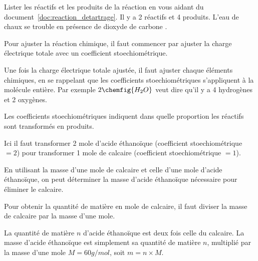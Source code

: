 \newpage
\pasDePagination
\setcounter{countCoupDePouce}{0}
\vspace*{-52pt}

%
\begin{coupDePouce}
  Lister les réactifs et les produits de la réaction en vous aidant du document~\ref{doc:reaction_detartrage}.
  Il y a 2 réactifs et 4 produits.
  L'eau de chaux se trouble en présence de dioxyde de carbone .
\end{coupDePouce}

%
\begin{coupDePouce}
  Pour ajuster la réaction chimique, il faut commencer par ajuster la charge électrique totale avec un coefficient stoechiométrique.
  
  Une fois la charge électrique totale ajustée, il faut ajuster chaque éléments chimiques, en se rappelant que les coefficients stoechiométriques s'appliquent à la molécule entière. 
  Par exemple $2\chemfig{H_2O}$ veut dire qu'il y a 4 hydrogènes et 2 oxygènes.
\end{coupDePouce}

%
\begin{coupDePouce}
  Les coefficients stoechiométriques indiquent dans quelle proportion les réactifs sont transformés en produits.
  
  Ici il faut transformer 2 mole d'acide éthanoïque (coefficient stoechiométrique $ = 2$) pour transformer 1 mole de calcaire (coefficient stoechiométrique $ = 1$).
  
  En utilisant la masse d'une mole de calcaire et celle d'une mole d'acide éthanoïque, on peut déterminer la masse d'acide éthanoïque nécessaire pour éliminer le calcaire.
\end{coupDePouce}

%
\begin{coupDePouce}
  Pour obtenir la quantité de matière en mole de calcaire, il faut diviser la masse de calcaire par la masse d'une mole.
  
  La quantité de matière $n$ d'acide éthanoïque est deux fois celle du calcaire.
  La masse d'acide éthanoïque est simplement sa quantité de matière $n$, multiplié par la masse d'une mole $M = 60 \unit{g / mol}$, soit $m = n \times M$.
\end{coupDePouce}


